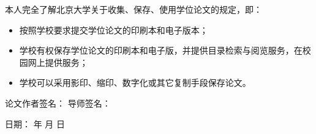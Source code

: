 \documentclass[12pt, a4paper]{ctexart}
\begin{document}
本人完全了解北京大学关于收集、保存、使用学位论文的规定，即：
\begin{itemize}
    \item 按照学校要求提交学位论文的印刷本和电子版本；
    \item 学校有权保存学位论文的印刷本和电子版，并提供目录检索与阅览服务，在校园网上提供服务；
    \item 学校可以采用影印、缩印、数字化或其它复制手段保存论文。
\end{itemize}

\vspace{2em} %

\hfill 论文作者签名：\underline{\hspace{3cm}} \hspace{2em} 导师签名：\underline{\hspace{3cm}}

\vspace{1em} %

\hfill 日期：\underline{\hspace{2cm}} 年 \underline{\hspace{1cm}} 月 \underline{\hspace{1cm}} 日      
\end{document}
